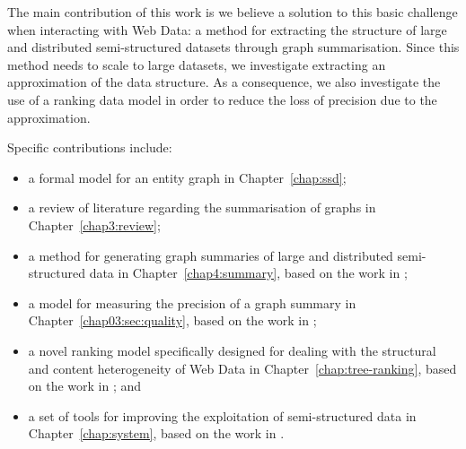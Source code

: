 The main contribution of this work is we believe a solution to this basic challenge when interacting with Web Data: a method for extracting the structure of large and distributed semi-structured datasets through graph summarisation. Since this method needs to scale to large datasets, we investigate extracting an approximation of the data structure. As a consequence, we also investigate the use of a ranking data model in order to reduce the loss of precision due to the approximation.

Specific contributions include:
\begin{itemize}
	\item a formal model for an entity graph in Chapter~\ref{chap:ssd};
	\item a review of literature regarding the summarisation of graphs in Chapter~\ref{chap3:review};
	\item a method for generating graph summaries of large and distributed semi-structured data in Chapter~\ref{chap4:summary}, based on the work in \cite{campinas:2012:dexa,campinas:2013:efficiency};
	\item a model for measuring the precision of a graph summary in Chapter~\ref{chap03:sec:quality}, based on the work in \cite{campinas:2013:efficiency};
	\item a novel ranking model specifically designed for dealing with the structural and content heterogeneity of Web Data in Chapter~\ref{chap:tree-ranking}, based on the work in \cite{campinas:2011:semsearch,campinas:2012:bm25mf}; and
	\item a set of tools for improving the exploitation of semi-structured data in Chapter~\ref{chap:system}, based on the work in \cite{auer:2014:linked}.
\end{itemize}
